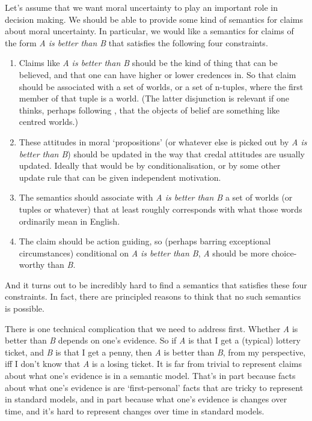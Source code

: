 Let's assume that we want moral uncertainty to play an important role in decision making. We should be able to provide some kind of semantics for claims about moral uncertainty. In particular, we would like a semantics for claims of the form \emph{A is better than B} that satisfies the following four constraints.

\begin{enumerate}
\item{} Claims like \emph{A is better than B} should be the kind of thing that can be believed, and that one can have higher or lower credences in. So that claim should be associated with a set of worlds, or a set of n-tuples, where the first member of that tuple is a world. (The latter disjunction is relevant if one thinks, perhaps following \citet{Lewis1979}, that the objects of belief are something like centred worlds.)

\item{} These attitudes in moral `propositions' (or whatever else is picked out by \emph{A is better than B}) should be updated in the way that credal attitudes are usually updated. Ideally that would be by conditionalisation, or by some other update rule that can be given independent motivation.

\item{} The semantics should associate with \emph{A is better than B} a set of worlds (or tuples or whatever) that at least roughly corresponds with what those words ordinarily mean in English.

\item{} The claim should be action guiding, so (perhaps barring exceptional circumstances) conditional on \emph{A is better than B}, \emph{A} should be more choice-worthy than \emph{B}.

\end{enumerate}
And it turns out to be incredibly hard to find a semantics that satisfies these four constraints. In fact, there are principled reasons to think that no such semantics is possible.

There is one technical complication that we need to address first. Whether \emph{A} is better than \emph{B} depends on one's evidence. So if \emph{A} is that I get a (typical) lottery ticket, and \emph{B} is that I get a penny, then \emph{A} is better than \emph{B}, from my perspective, iff I don't know that \emph{A} is a losing ticket. It is far from trivial to represent claims about what one's evidence is in a semantic model. That's in part because facts about what one's evidence is are `first-personal' facts that are tricky to represent in standard models, and in part because what one's evidence is changes over time, and it's hard to represent changes over time in standard models.

